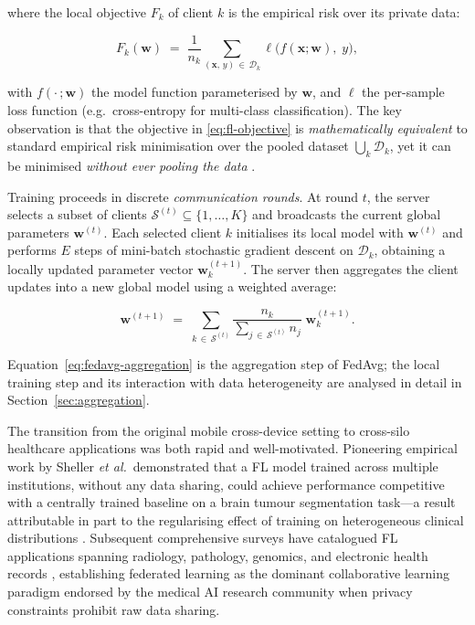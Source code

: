\noindent
where the local objective $F_k$ of client $k$ is the empirical risk
over its private data:

\begin{equation}
  F_k(\mathbf{w})
  \;=\;
  \frac{1}{n_k}
  \sum_{(\mathbf{x},\, y)\,\in\,\mathcal{D}_k}
  \ell\bigl(f(\mathbf{x};\mathbf{w}),\; y\bigr),
  \label{eq:local-risk}
\end{equation}

\noindent
with $f(\cdot\,;\mathbf{w})$ the model function parameterised by
$\mathbf{w}$, and $\ell$ the per-sample loss function (e.g.\
cross-entropy for multi-class classification).
The key observation is that the objective in
\eqref{eq:fl-objective} is \emph{mathematically equivalent} to
standard empirical risk minimisation over the pooled dataset
$\bigcup_k \mathcal{D}_k$, yet it can be minimised
\emph{without ever pooling the data}
\cite{kairouz2021advances}.

Training proceeds in discrete \emph{communication rounds}.
At round $t$, the server selects a subset of clients
$\mathcal{S}^{(t)} \subseteq \{1,\ldots,K\}$ and broadcasts the
current global parameters $\mathbf{w}^{(t)}$.
Each selected client $k$ initialises its local model with
$\mathbf{w}^{(t)}$ and performs $E$ steps of mini-batch stochastic
gradient descent on $\mathcal{D}_k$, obtaining a locally updated
parameter vector $\mathbf{w}_k^{(t+1)}$.
The server then aggregates the client updates into a new global
model using a weighted average:

\begin{equation}
  \mathbf{w}^{(t+1)}
  \;=\;
  \sum_{k\,\in\,\mathcal{S}^{(t)}}
  \frac{n_k}{\displaystyle\sum_{j\,\in\,\mathcal{S}^{(t)}} n_j}\;
  \mathbf{w}_k^{(t+1)}.
  \label{eq:fedavg-aggregation}
\end{equation}

Equation~\eqref{eq:fedavg-aggregation} is the aggregation step of
FedAvg; the local training step and its interaction with data
heterogeneity are analysed in detail in Section~\ref{sec:aggregation}.

The transition from the original mobile cross-device setting to
cross-silo healthcare applications was both rapid and well-motivated.
Pioneering empirical work by Sheller \emph{et al.}\ demonstrated
that a FL model trained across multiple institutions, without any
data sharing, could achieve performance competitive with a centrally
trained baseline on a brain tumour segmentation task—a result
attributable in part to the regularising effect of training on
heterogeneous clinical distributions \cite{sheller2020federated}.
Subsequent comprehensive surveys have catalogued FL applications
spanning radiology, pathology, genomics, and electronic health records
\cite{rieke2020future,nguyen2022federated,kaissis2020secure},
establishing federated learning as the dominant collaborative learning
paradigm endorsed by the medical AI research community when privacy
constraints prohibit raw data sharing.

